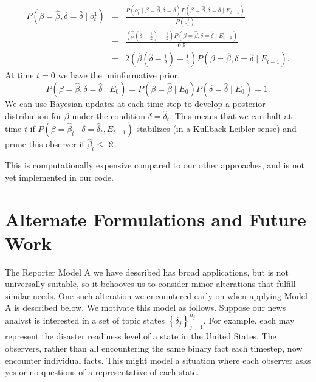 \documentclass{amsart}
\theoremstyle{plain}
\numberwithin{equation}{section}
\begin{document}
\begin{eqnarray*}
P\left( \beta =\hat{\beta},\delta =\hat{\delta}\mid o_{t}^{1}\right)  &=&%
\frac{P\left( o_{t}^{1}\mid \beta =\hat{\beta},\delta =\hat{\delta}\right)
P\left( \beta =\hat{\beta},\delta =\hat{\delta}\mid E_{t-1}\right) }{P\left(
o_{t}^{1}\right) } \\
&=&\frac{\left( \hat{\beta}\left( \hat{\delta}-\frac{1}{2}\right) +\frac{1}{2%
}\right) P\left( \beta =\hat{\beta},\delta =\hat{\delta}\mid E_{t-1}\right) 
}{0.5} \\
&=&2\left( \hat{\beta}\left( \hat{\delta}-\frac{1}{2}\right) +\frac{1}{2}%
\right) P\left( \beta =\hat{\beta},\delta =\hat{\delta}\mid E_{t-1}\right) .
\end{eqnarray*}%
At time $t=0$ we have the uninformative prior, 
\begin{equation*}
P\left( \beta =\hat{\beta},\delta =\hat{\delta}\mid E_{0}\right) =P\left(
\beta =\hat{\beta}\mid E_{0}\right) P\left( \delta =\hat{\delta}\mid
E_{0}\right) =1.
\end{equation*}%
We can use Bayesian updates at each time step to develop a posterior
distribution for $\beta $ under the condition $\delta =\hat{\delta}_{t}$.
This means that we can halt at time $t$ if $P\left( \beta =\hat{\beta}%
_{t}\mid \delta =\hat{\delta}_{t},E_{t-1}\right) $ stabilizes (in a
Kullback-Leibler sense) and prune this observer if $\hat{\beta}_{t}\leq
\aleph $.

This is computationally expensive compared to our other approaches, and is
not yet implemented in our code.

\section{Alternate Formulations and Future Work}

The Reporter Model A we have described has broad applications, but is not
universally suitable, so it behooves us to consider minor alterations that
fulfill similar needs. One such alteration we encountered early on when
applying Model A is described below. We motivate this model as follows.
Suppose our news analyst is interested in a set of topic states $\left\{
\delta _{j}\right\} _{j=1}^{n_{j}}.$ For example, each may represent the
disaster readiness level of a state in the United States. The observers,
rather than all encountering the same binary fact each timestep, now
encounter individual facts. This might model a situation where each observer
asks yes-or-no-questions of a representative of each state. 
\end{document}
